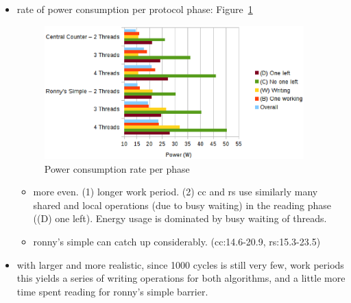 \documentclass[a4paper, 10pt]{article}
\begin{document}
\begin{itemize}
\begin{itemize}
		\end{itemize}
	\item rate of power consumption per protocol phase: Figure~\ref{fig:cs-power-work-1000}
		\begin{figure}[htbp]
			\centering
			\includegraphics[width=10cm]{charts/cs-power-work-1000}
			\caption{Power consumption rate per phase}
			\label{fig:cs-power-work-1000}
		\end{figure}
		\begin{itemize}
			\item more even. (1) longer work period. (2) cc and rs use similarly many shared and local operations (due to busy waiting) in the reading phase ((D) one left). Energy usage is dominated by busy waiting of threads.
			\item ronny's simple can catch up considerably. (cc:14.6-20.9, rs:15.3-23.5)
		\end{itemize}
	\item with larger and more realistic, since 1000 cycles is still very few, work periods this yields a series of writing operations for both algorithms, and a little more time spent reading for ronny's simple barrier.
\end{itemize}
\end{document}
